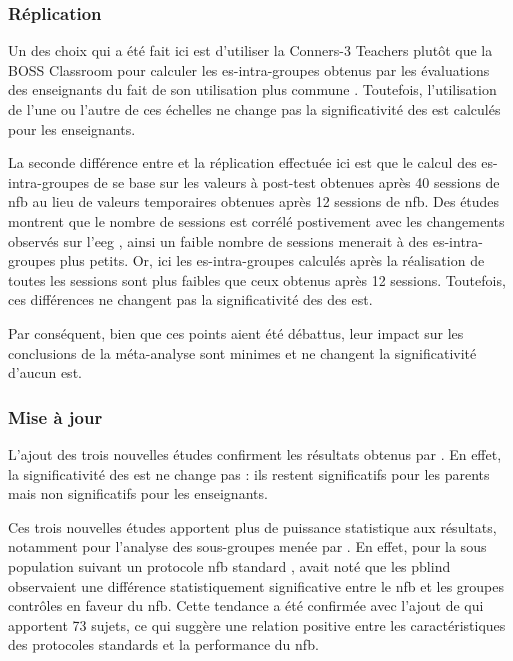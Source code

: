 \subsubsection{Réplication}

Un des choix qui a été fait ici est d'utiliser la Conners-3 Teachers \citep{Conners2008} plutôt que la BOSS Classroom \citep{Shapiro2010} 
pour calculer les \gls{es}-intra-groupes obtenus par les évaluations des enseignants du fait de son utilisation plus commune \citep{Christiansen2014, Bluschke2016}.
Toutefois, l'utilisation de l'une ou l'autre de ces échelles ne change pas la significativité des \gls{est} calculés pour les enseignants. 

La seconde différence entre \citep{Cortese2016} et la réplication effectuée ici est que le calcul des \gls{es}-intra-groupes de \citet{Arnold2014} se base 
sur les valeurs à post-test obtenues après 40 sessions de \gls{nfb} au lieu de valeurs temporaires obtenues après 12 sessions de \gls{nfb}. Des études montrent
que le nombre de sessions est corrélé postivement avec les changements observés sur l'\gls{eeg} \citep{Vernon2004}, ainsi un faible nombre de sessions menerait
à des \gls{es}-intra-groupes plus petits. Or, ici les \gls{es}-intra-groupes calculés après la réalisation de toutes les sessions sont plus faibles que ceux 
obtenus après 12 sessions. Toutefois, ces différences ne changent pas la significativité des des \gls{est}. 

Par conséquent, bien que ces points aient été débattus, leur impact sur les conclusions de la méta-analyse sont minimes et ne changent la significativité
d'aucun \gls{est}. 

\subsubsection{Mise à jour}

L'ajout des trois nouvelles études \citep{Baumeister2016, Strehl2017, Bazanova2018} confirment les résultats obtenus par \citep{Cortese2016}. En effet,
la significativité des \gls{est} ne change pas : ils restent significatifs pour les parents mais non significatifs pour les enseignants. 

Ces trois nouvelles études apportent plus de puissance statistique aux résultats, notamment pour l'analyse des sous-groupes menée par \citet{Cortese2016}.
En effet, pour la sous population suivant un protocole \gls{nfb} standard \citep{Arns2014}, \citet{Cortese2016} avait noté que les \gls{pblind} observaient
une différence statistiquement significative entre le \gls{nfb} et les groupes contrôles en faveur du \gls{nfb}. Cette tendance a été confirmée avec l'ajout 
de \citet{Baumeister2016, Strehl2017} qui apportent 73 sujets, ce qui suggère une relation positive entre les caractéristiques des protocoles standards
et la performance du \gls{nfb}. 

